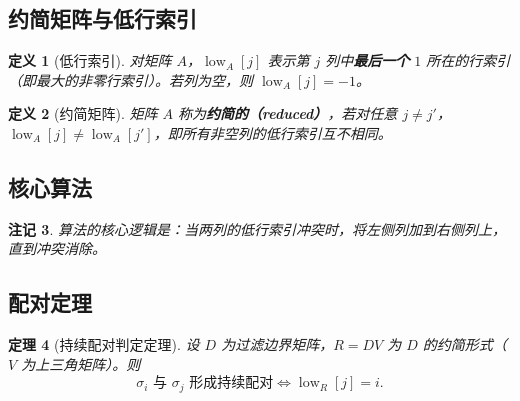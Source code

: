 \documentclass[UTF8]{ctexart}
\newtheorem{definition}{定义}[section]
\newtheorem{remark}[definition]{注记}
\newtheorem{theorem}[definition]{定理}
\begin{document}
\subsection{约简矩阵与低行索引}

\begin{definition}[低行索引]
\label{def:low}
对矩阵 \(A\)，\(\operatorname{low}_A[j]\) 表示第 \(j\) 列中\textbf{最后一个} \(1\) 所在的行索引（即最大的非零行索引）。若列为空，则 \(\operatorname{low}_A[j] = -1\)。
\end{definition}

\begin{definition}[约简矩阵]
\label{def:reduced}
矩阵 \(A\) 称为\textbf{约简的（reduced）}，若对任意 \(j \neq j'\)，\(\operatorname{low}_A[j] \neq \operatorname{low}_A[j']\)，即所有非空列的低行索引互不相同。
\end{definition}

\subsection{核心算法}

\begin{algorithm}[htbp]
\caption{MATPERSISTENCE}
\label{alg:matpersistence}
\end{algorithm}

\begin{remark}
算法的核心逻辑是：当两列的低行索引冲突时，将左侧列加到右侧列上，直到冲突消除。
\end{remark}

\subsection{配对定理}

\begin{theorem}[持续配对判定定理]
\label{thm:persistence-pairing}
设 \(D\) 为过滤边界矩阵，\(R = DV\) 为 \(D\) 的约简形式（\(V\) 为上三角矩阵）。则
\[
\sigma_i \text{ 与 } \sigma_j \text{ 形成持续配对} \iff \operatorname{low}_R[j] = i.
\]
\end{theorem}
\end{document}
